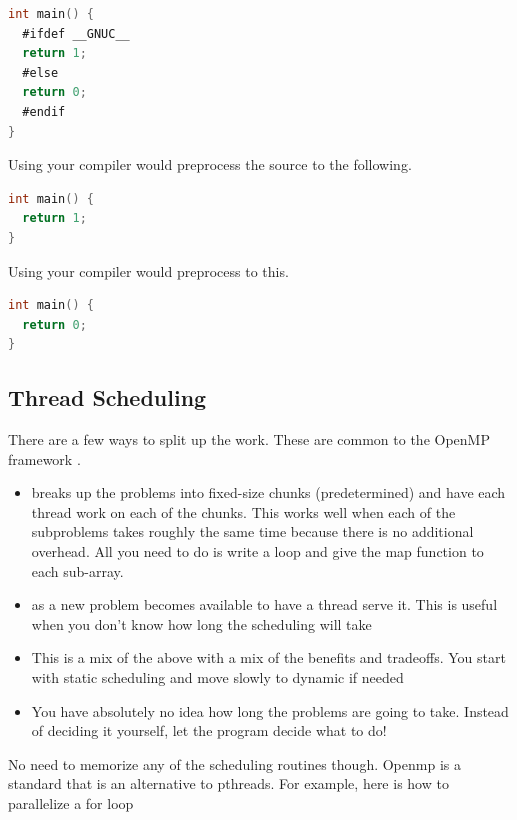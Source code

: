 \begin{lstlisting}[language=C]
int main() {
  #ifdef __GNUC__
  return 1;
  #else
  return 0;
  #endif
}
\end{lstlisting}

Using  your compiler would preprocess the source to the following.

\begin{lstlisting}[language=C]
int main() {
  return 1;
}
\end{lstlisting}

Using  your compiler would preprocess to this.

\begin{lstlisting}[language=C]
int main() {
  return 0;
}
\end{lstlisting}


\subsection{Thread Scheduling}

There are a few ways to split up the work.
These are common to the OpenMP framework \cite{silberschatz2005operating}.

\begin{itemize}
\item {} breaks up the problems into fixed-size chunks (predetermined) and have each thread work on each of the chunks.
  This works well when each of the subproblems takes roughly the same time because there is no additional overhead.
  All you need to do is write a loop and give the map function to each sub-array.
\item {} as a new problem becomes available to have a thread serve it.
  This is useful when you don't know how long the scheduling will take
\item {} This is a mix of the above with a mix of the benefits and tradeoffs.
  You start with static scheduling and move slowly to dynamic if needed
\item {} You have absolutely no idea how long the problems are going to take.
  Instead of deciding it yourself, let the program decide what to do!
\end{itemize}

No need to memorize any of the scheduling routines though.
Openmp is a standard that is an alternative to pthreads.
For example, here is how to parallelize a for loop

